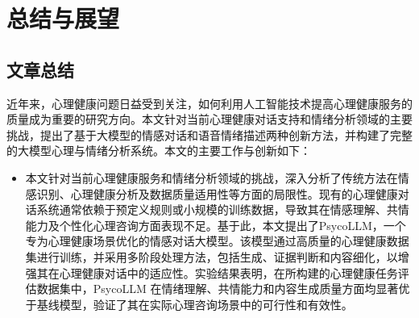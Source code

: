 
\chapter{总结与展望}

\section{文章总结}

近年来，心理健康问题日益受到关注，如何利用人工智能技术提高心理健康服务的质量成为重要的研究方向。本文针对当前心理健康对话支持和情绪分析领域的主要挑战，提出了基于大模型的情感对话和语音情绪描述两种创新方法，并构建了完整的大模型心理与情绪分析系统。本文的主要工作与创新如下：

\begin{itemize}
  \item 本文针对当前心理健康服务和情绪分析领域的挑战，深入分析了传统方法在情感识别、心理健康分析及数据质量适用性等方面的局限性。现有的心理健康对话系统通常依赖于预定义规则或小规模的训练数据，导致其在情感理解、共情能力及个性化心理咨询方面表现不足。基于此，本文提出了PsycoLLM，一个专为心理健康场景优化的情感对话大模型。该模型通过高质量的心理健康数据集进行训练，并采用多阶段处理方法，包括生成、证据判断和内容细化，以增强其在心理健康对话中的适应性。实验结果表明，在所构建的心理健康任务评估数据集中，PsycoLLM 在情绪理解、共情能力和内容生成质量方面均显著优于基线模型，验证了其在实际心理咨询场景中的可行性和有效性。

\end{itemize}
